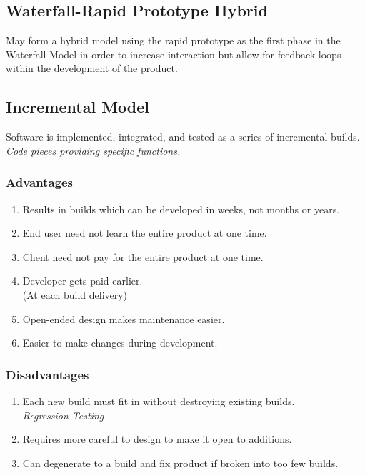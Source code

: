 \documentclass{report}
\begin{document}
		\subsection{Waterfall-Rapid Prototype Hybrid}
			May form a hybrid model using the rapid prototype as the first phase in the Waterfall Model in order to increase interaction but allow for feedback loops within the development of the product.
		\subsection{Incremental Model}
			Software is implemented, integrated, and tested as a series of incremental builds.\\
				\textit{Code pieces providing specific functions.}
			\subsubsection{Advantages}
				\begin{enumerate}
					\item Results in builds which can be developed in weeks, not months or years.
					\item End user need not learn the entire product at one time.
					\item Client need not pay for the entire product at one time.
					\item Developer gets paid earlier.\\ (At each build delivery)
					\item Open-ended design makes maintenance easier.
					\item Easier to make changes during development.
				\end{enumerate}
			\subsubsection{Disadvantages}
				\begin{enumerate}
					\item Each new build must fit in without destroying existing builds.\\
						\textit{Regression Testing}
					\item Requires more careful to design to make it open to additions.
					\item Can degenerate to a build and fix product if broken into too few builds.
				\end{enumerate}
\end{document}
